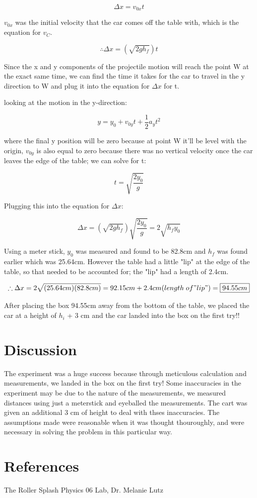 \documentclass[aps,letterpaper,11pt]{revtex4}
\begin{document}
$$ \Delta x = v_{0x}t$$

$v_{0x}$ was the initial velocity that the car comes off the table with, which is the equation for $v_C$.

$$ \therefore \Delta x = (\sqrt{2gh_f})t$$

Since the x and y components of the projectile motion will reach the point W at the exact same time, we can find the time it takes for the car to travel in the y direction to W and plug it into the equation for $\Delta x$ for t.

looking at the motion in the y-direction:

$$ y = y_0 + v_{0y}t + \frac{1}{2}a_yt^2$$

where the final y position will be zero because at point W it'll be level with the origin, $v_{0y}$ is also equal to zero because there was no vertical velocity once the car leaves the edge of the table; we can solve for t:

$$ t = \sqrt{\frac{2y_0}{g}}$$

Plugging this into the equation for $\Delta x$:

$$ \Delta x = (\sqrt{2gh_f})\sqrt{\frac{2y_0}{g}} = \boxed{2\sqrt{h_fy_0}}$$

Using a meter stick, $y_0$ was measured and found to be 82.8cm and $h_f$ was found earlier which was 25.64cm. However the table had a little "lip" at the edge of the table, so that needed to be accounted for; the "lip" had a length of 2.4cm. 

$$ \therefore \Delta x = 2\sqrt{(25.64cm)(82.8cm)} = 92.15cm + 2.4cm(length \hspace{1mm} of "lip") = \boxed{94.55cm}$$

After placing the box 94.55cm away from the bottom of the table, we placed the car at a height of $h_i$ + 3 cm and the car landed into the box on the first try!!

\section{Discussion} 

The experiment was a huge success because through meticulous calculation and measurements, we landed in the box on the first try! Some inaccuracies in the experiment may be due to the nature of the measurements, we measured distances using just a meterstick and eyeballed the measurements. The cart was given an additional 3 cm of height to deal with thses inaccuracies. The assumptions made were reasonable when it was thought thouroughly, and were necessary in solving the problem in this particular way.

\section{References}

\hspace{-6.5mm}
The Roller Splash Physics 06 Lab, Dr. Melanie Lutz\\
\end{document}
